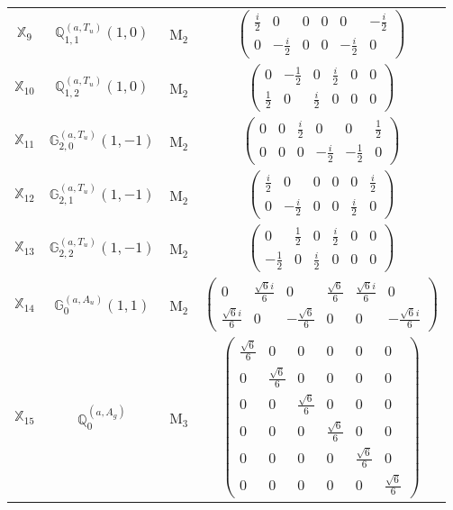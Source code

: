 \documentclass[fleqn,10pt,landscape]{article}
\begin{document}
\begin{itemize}
\begin{center}
\begin{longtable}{c|c|c|c}
$ \mathbb{X}_{9} $ & $\mathbb{Q}_{1,1}^{(a,T_{u})}(1,0)$ & M$_{2}$ & $\begin{pmatrix} \frac{i}{2} & 0 & 0 & 0 & 0 & - \frac{i}{2} \\ 0 & - \frac{i}{2} & 0 & 0 & - \frac{i}{2} & 0 \end{pmatrix}$ \\
$ \mathbb{X}_{10} $ & $\mathbb{Q}_{1,2}^{(a,T_{u})}(1,0)$ & M$_{2}$ & $\begin{pmatrix} 0 & - \frac{1}{2} & 0 & \frac{i}{2} & 0 & 0 \\ \frac{1}{2} & 0 & \frac{i}{2} & 0 & 0 & 0 \end{pmatrix}$ \\
$ \mathbb{X}_{11} $ & $\mathbb{G}_{2,0}^{(a,T_{u})}(1,-1)$ & M$_{2}$ & $\begin{pmatrix} 0 & 0 & \frac{i}{2} & 0 & 0 & \frac{1}{2} \\ 0 & 0 & 0 & - \frac{i}{2} & - \frac{1}{2} & 0 \end{pmatrix}$ \\
$ \mathbb{X}_{12} $ & $\mathbb{G}_{2,1}^{(a,T_{u})}(1,-1)$ & M$_{2}$ & $\begin{pmatrix} \frac{i}{2} & 0 & 0 & 0 & 0 & \frac{i}{2} \\ 0 & - \frac{i}{2} & 0 & 0 & \frac{i}{2} & 0 \end{pmatrix}$ \\
$ \mathbb{X}_{13} $ & $\mathbb{G}_{2,2}^{(a,T_{u})}(1,-1)$ & M$_{2}$ & $\begin{pmatrix} 0 & \frac{1}{2} & 0 & \frac{i}{2} & 0 & 0 \\ - \frac{1}{2} & 0 & \frac{i}{2} & 0 & 0 & 0 \end{pmatrix}$ \\
$ \mathbb{X}_{14} $ & $\mathbb{G}_{0}^{(a,A_{u})}(1,1)$ & M$_{2}$ & $\begin{pmatrix} 0 & \frac{\sqrt{6} i}{6} & 0 & \frac{\sqrt{6}}{6} & \frac{\sqrt{6} i}{6} & 0 \\ \frac{\sqrt{6} i}{6} & 0 & - \frac{\sqrt{6}}{6} & 0 & 0 & - \frac{\sqrt{6} i}{6} \end{pmatrix}$ \\ \hline
$ \mathbb{X}_{15} $ & $\mathbb{Q}_{0}^{(a,A_{g})}$ & M$_{3}$ & $\begin{pmatrix} \frac{\sqrt{6}}{6} & 0 & 0 & 0 & 0 & 0 \\ 0 & \frac{\sqrt{6}}{6} & 0 & 0 & 0 & 0 \\ 0 & 0 & \frac{\sqrt{6}}{6} & 0 & 0 & 0 \\ 0 & 0 & 0 & \frac{\sqrt{6}}{6} & 0 & 0 \\ 0 & 0 & 0 & 0 & \frac{\sqrt{6}}{6} & 0 \\ 0 & 0 & 0 & 0 & 0 & \frac{\sqrt{6}}{6} \end{pmatrix}$ \\

\end{longtable}
\end{center}
\end{itemize}
\end{document}

